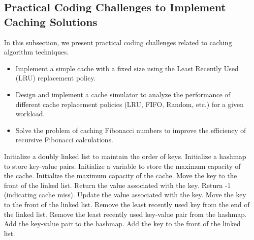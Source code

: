 \documentclass[12pt]{book} %
\begin{document}
\subsection{Practical Coding Challenges to Implement Caching Solutions}
In this subsection, we present practical coding challenges related to caching algorithm techniques.

\begin{itemize}
    \item Implement a simple cache with a fixed size using the Least Recently Used (LRU) replacement policy.
    \item Design and implement a cache simulator to analyze the performance of different cache replacement policies (LRU, FIFO, Random, etc.) for a given workload.
    \item Solve the problem of caching Fibonacci numbers to improve the efficiency of recursive Fibonacci calculations.
\end{itemize}

\FloatBarrier
\begin{algorithm}
\caption{LRU Cache Implementation}
\begin{algorithmic}[1]
\State Initialize a doubly linked list to maintain the order of keys.
\State Initialize a hashmap to store key-value pairs.
\State Initialize a variable to store the maximum capacity of the cache.
    \State Initialize the maximum capacity of the cache.
\EndProcedure
{}
        \State Move the key to the front of the linked list.
        \State Return the value associated with the key.
    \Else
        \State Return -1 (indicating cache miss).
    \EndIf
\EndProcedure
{}
        \State Update the value associated with the key.
        \State Move the key to the front of the linked list.
    \Else
            \State Remove the least recently used key from the end of the linked list.
            \State Remove the least recently used key-value pair from the hashmap.
        \EndIf
        \State Add the key-value pair to the hashmap.
        \State Add the key to the front of the linked list.
    \EndIf
\EndProcedure
\end{algorithmic}
\end{algorithm}
\FloatBarrier
\end{document}
